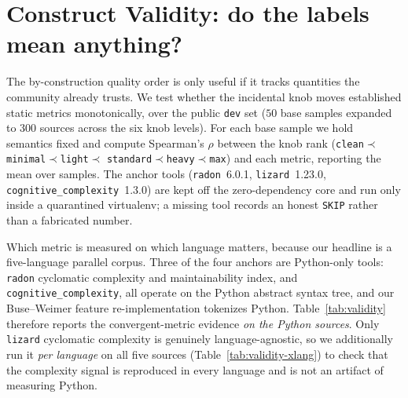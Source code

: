 
\section{Construct Validity: do the labels mean anything?}
\label{sec:validity}

The by-construction quality order is only useful if it tracks quantities the community
already trusts. We test whether the incidental knob moves established static metrics
monotonically, over the public \texttt{dev} set ($50$ base samples expanded to $300$
sources across the six knob levels). For each base sample we hold semantics fixed and
compute Spearman's $\rho$ between the knob rank
(\texttt{clean}${}\prec{}$\texttt{minimal}${}\prec{}$\texttt{light}${}\prec{}$%
\texttt{standard}${}\prec{}$\texttt{heavy}${}\prec{}$\texttt{max}) and each metric,
reporting the mean over samples. The anchor tools
(\texttt{radon}~6.0.1, \texttt{lizard}~1.23.0, \texttt{cognitive\_complexity}~1.3.0)
are kept off the zero-dependency core and run only inside a quarantined virtualenv; a
missing tool records an honest \texttt{SKIP} rather than a fabricated number.

Which metric is measured on which language matters, because our headline is a
five-language parallel corpus. Three of the four anchors are Python-only tools:
\texttt{radon} cyclomatic complexity and maintainability index, and
\texttt{cognitive\_complexity}, all operate on the Python abstract syntax tree, and our
Buse--Weimer feature re-implementation tokenizes Python. Table~\ref{tab:validity} therefore
reports the convergent-metric evidence \emph{on the Python sources}. Only \texttt{lizard}
cyclomatic complexity is genuinely language-agnostic, so we additionally run it
\emph{per language} on all five sources (Table~\ref{tab:validity-xlang}) to check that the
complexity signal is reproduced in every language and is not an artifact of measuring
Python.

